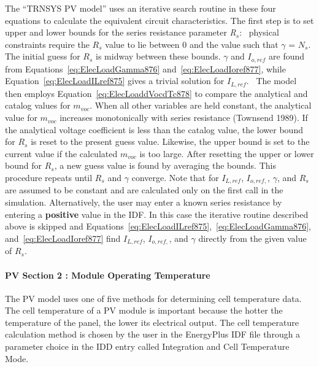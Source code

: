 The ``TRNSYS PV model'' uses an iterative search routine in these four equations to calculate the equivalent circuit characteristics. The first step is to set upper and lower bounds for the series resistance parameter \emph{R\(_{s}\)}:~ physical constraints require the \(R_{s}\) value to lie between 0 and the value such that \(\gamma\) = \(N_{s}\). The initial guess for \(R_{s}\) is midway between these bounds. \(\gamma\) and \(I_{o,ref}\) are found from Equations~\ref{eq:ElecLoadGamma876} and~\ref{eq:ElecLoadIoref877}, while Equation~\ref{eq:ElecLoadILref875} gives a trivial solution for \(I_{L,ref}\).~ The model then employs Equation~\ref{eq:ElecLoaddVocdTc878} to compare the analytical and catalog values for \(m_{voc}\). When all other variables are held constant, the analytical value for \(m_{voc}\) increases monotonically with series resistance (Townsend 1989). If the analytical voltage coefficient is less than the catalog value, the lower bound for \(R_{s}\) is reset to the present guess value. Likewise, the upper bound is set to the current value if the calculated \(m_{voc}\) is too large. After resetting the upper or lower bound for \(R_{s}\), a new guess value is found by averaging the bounds. This procedure repeats until \(R_{s}\) and \(\gamma\) converge. Note that for \(I_{L,ref}\), \(I_{o,ref,}\), \(\gamma\), and \(R_{s}\) are assumed to be constant and are calculated only on the first call in the simulation. Alternatively, the user may enter a known series resistance by entering a \textbf{positive} value in the IDF. In this case the iterative routine described above is skipped and Equations~\ref{eq:ElecLoadILref875},~\ref{eq:ElecLoadGamma876}, and~\ref{eq:ElecLoadIoref877} find \(I_{L,ref}\), \(I_{o,ref,}\), and \(\gamma\) directly from the given value of \(R_{s}\).

\paragraph{PV Section 2 : Module Operating Temperature}\label{pv-section-2-module-operating-temperature}

The PV model uses one of five methods for determining cell temperature data. The cell temperature of a PV module is important because the hotter the temperature of the panel, the lower its electrical output. The cell temperature calculation method is chosen by the user in the EnergyPlus IDF file through a parameter choice in the IDD entry called Integration and Cell Temperature Mode.

